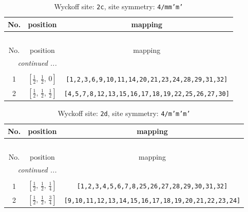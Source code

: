 \documentclass[fleqn,8pt]{jsarticle}
\begin{document}
\renewcommand{\arraystretch}{1.2}
\begin{longtable}{ccc}
\caption{Wyckoff site: {\tt 2c}, site symmetry: {\tt 4/mm'm'}}
 \\
 \hline \hline
No. & position & mapping \\ \hline \endfirsthead

\multicolumn{2}{l}{\tablename\ \thetable{}} \\
 \hline \hline
No. & position & mapping \\ \hline \endhead

 \hline \hline
\multicolumn{2}{r}{\footnotesize\it continued ...} \\ \endfoot

 \hline \hline
\multicolumn{2}{r}{} \\ \endlastfoot

1 & $\left[ \frac{1}{2},\, \frac{1}{2},\, 0 \right]$ & {\tt [1,2,3,6,9,10,11,14,20,21,23,24,28,29,31,32]} \\ \hline
2 & $\left[ \frac{1}{2},\, \frac{1}{2},\, \frac{1}{2} \right]$ & {\tt [4,5,7,8,12,13,15,16,17,18,19,22,25,26,27,30]} \\
\end{longtable}
\renewcommand{\arraystretch}{1.2}
\begin{longtable}{ccc}
\caption{Wyckoff site: {\tt 2d}, site symmetry: {\tt 4/m'm'm'}}
 \\
 \hline \hline
No. & position & mapping \\ \hline \endfirsthead

\multicolumn{2}{l}{\tablename\ \thetable{}} \\
 \hline \hline
No. & position & mapping \\ \hline \endhead

 \hline \hline
\multicolumn{2}{r}{\footnotesize\it continued ...} \\ \endfoot

 \hline \hline
\multicolumn{2}{r}{} \\ \endlastfoot

1 & $\left[ \frac{1}{2},\, \frac{1}{2},\, \frac{1}{4} \right]$ & {\tt [1,2,3,4,5,6,7,8,25,26,27,28,29,30,31,32]} \\ \hline
2 & $\left[ \frac{1}{2},\, \frac{1}{2},\, \frac{3}{4} \right]$ & {\tt [9,10,11,12,13,14,15,16,17,18,19,20,21,22,23,24]} \\
\end{longtable}
\renewcommand{\arraystretch}{1.2}
\end{document}
